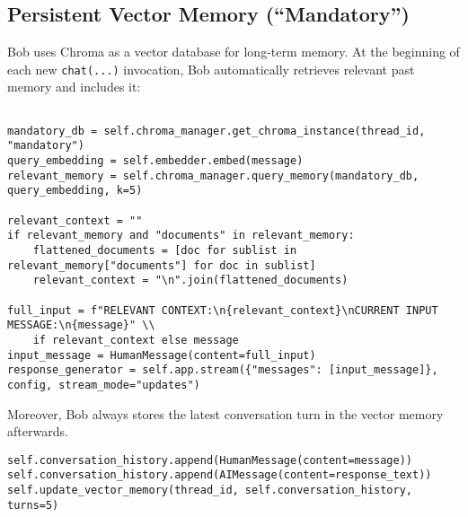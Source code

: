 \documentclass[11pt]{article}
\begin{document}
\subsection{Persistent Vector Memory (“Mandatory”)}
Bob uses Chroma as a vector database for long-term memory. 
At the beginning of each new \texttt{chat(...)} invocation, 
Bob automatically retrieves relevant past memory and includes it:
\begin{verbatim}

mandatory_db = self.chroma_manager.get_chroma_instance(thread_id, "mandatory")
query_embedding = self.embedder.embed(message)
relevant_memory = self.chroma_manager.query_memory(mandatory_db, query_embedding, k=5)

relevant_context = ""
if relevant_memory and "documents" in relevant_memory:
    flattened_documents = [doc for sublist in relevant_memory["documents"] for doc in sublist]
    relevant_context = "\n".join(flattened_documents)

full_input = f"RELEVANT CONTEXT:\n{relevant_context}\nCURRENT INPUT MESSAGE:\n{message}" \\
    if relevant_context else message
input_message = HumanMessage(content=full_input)
response_generator = self.app.stream({"messages": [input_message]}, config, stream_mode="updates")

\end{verbatim}

Moreover, Bob always stores the latest conversation turn in the vector memory afterwards.

\begin{verbatim}
self.conversation_history.append(HumanMessage(content=message))
self.conversation_history.append(AIMessage(content=response_text))
self.update_vector_memory(thread_id, self.conversation_history, turns=5)
\end{verbatim}
\end{document}
